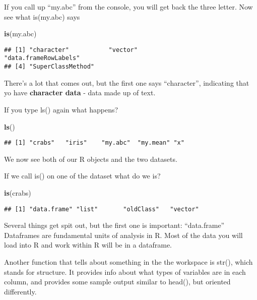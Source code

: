 \documentclass[]{book}
\newenvironment{Shaded}{\begin{snugshade}}{\end{snugshade}}
\newcommand{\KeywordTok}[1]{\textcolor[rgb]{0.13,0.29,0.53}{\textbf{#1}}}
\newcommand{\NormalTok}[1]{#1}
\theoremstyle{definition}
\theoremstyle{definition}
\theoremstyle{definition}
\theoremstyle{remark}
\begin{document}
If you call up ``my.abc'' from the console, you will get back the three
letter. Now see what is(my.abc) says

\begin{Shaded}
\begin{Highlighting}[]
\KeywordTok{is}\NormalTok{(my.abc)}
\end{Highlighting}
\end{Shaded}

\begin{verbatim}
## [1] "character"           "vector"              "data.frameRowLabels"
## [4] "SuperClassMethod"
\end{verbatim}

There's a lot that comes out, but the first one says ``character'',
indicating that yo have \textbf{character data} - data made up of text.

If you type ls() again what happens?

\begin{Shaded}
\begin{Highlighting}[]
\KeywordTok{ls}\NormalTok{()}
\end{Highlighting}
\end{Shaded}

\begin{verbatim}
## [1] "crabs"   "iris"    "my.abc"  "my.mean" "x"
\end{verbatim}

We now see both of our R objects and the two datasets.

If we call is() on one of the dataset what do we is?

\begin{Shaded}
\begin{Highlighting}[]
\KeywordTok{is}\NormalTok{(crabs)}
\end{Highlighting}
\end{Shaded}

\begin{verbatim}
## [1] "data.frame" "list"       "oldClass"   "vector"
\end{verbatim}

Several things get spit out, but the first one is important:
``data.frame'' Dataframes are fundamental units of analysis in R. Most
of the data you will load into R and work within R will be in a
dataframe.

Another function that tells about something in the the workspace is
str(), which stands for structure. It provides info about what types of
variables are in each column, and provides some sample output similar to
head(), but oriented differently.
\end{document}
